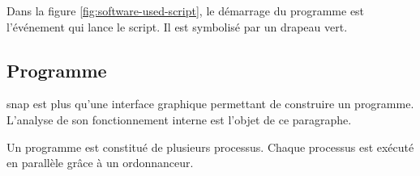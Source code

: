 Dans la figure \ref{fig:software-used-script}, le démarrage du programme est l'événement qui lance le \gls{script}. Il est symbolisé par un drapeau vert.

\subsection{Programme}
\gls{snap} est plus qu'une interface graphique permettant de construire un programme. L'analyse de son fonctionnement interne est l'objet de ce paragraphe.

Un programme est constitué de plusieurs processus. Chaque processus est exécuté en parallèle grâce à un ordonnanceur.

%
%
%
%
%

